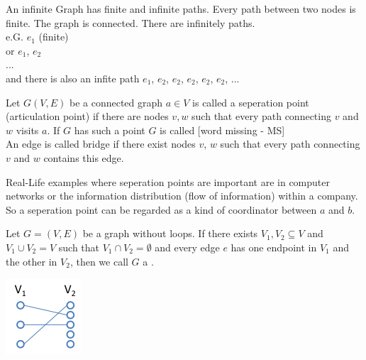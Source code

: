 An infinite Graph has finite and infinite paths. Every path between two nodes is finite. The graph is connected. There are infinitely paths.\\
e.G. $e{_1}$ (finite)\\
or $e{_1}$, $e{_2}$\\
...\\
and there is also an infite path $e{_1}$, $e{_2}$, $e{_2}$, $e{_2}$, $e{_2}$, $e{_2}$, ...\\


\begin{definition}
    Let $G(V,E)$ be a connected graph $a \in V$ is called a seperation point (articulation point) if there are nodes $v, w$ such that every path connecting $v$ and $w$ visits $a$. If $G$ has such a point $G$ is called [word missing - MS]\\
    An edge is called bridge if there exist nodes $v$, $w$ such that every path connecting $v$ and $w$ contains this edge.
\end{definition}

\begin{example*}
Real-Life examples where seperation points are important are in computer networks or the information distribution (flow of information) within a company. So a seperation point can be regarded as a kind of coordinator between $a$ and $b$.
\end{example*}

\begin{definition}
    Let $G = (V,E)$ be a graph without loops. If there exists $V_{1}, V_{2} \subseteq V$ and $V_{1} \cup V_{2} = V$
    such that $V_{1} \cap V_{2} = \emptyset$ and every edge $e$ has one endpoint in $V{_1}$ and the other in $V_{2}$,
    then we call $G$ a .
\end{definition}

\begin{example*}
    \includegraphics{diagrams/def14_example1.png}
\end{example*}

